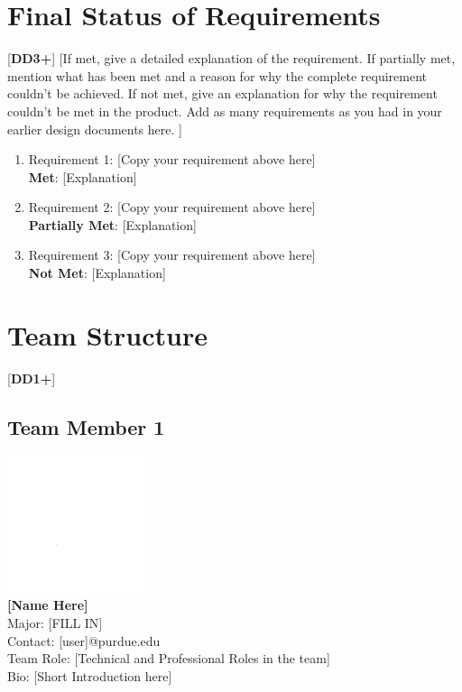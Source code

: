 \documentclass[letterpaper, 11pt]{article}
\begin{document}
\clearpage
\section{Final Status of Requirements}
 [\textbf{DD3+}]
 [If met, give a detailed explanation of the requirement. If partially met, mention what has been met and a reason for why the complete requirement couldn’t be achieved. If not met, give an explanation for why the requirement couldn’t be met in the product. Add as many requirements as you had in your earlier design documents here. ]
\begin{enumerate}
    \item Requirement 1: [Copy your requirement above here] \\
          \textbf{Met}: [Explanation]
    \item Requirement 2: [Copy your requirement above here] \\
          \textbf{Partially Met}: [Explanation]
    \item Requirement 3: [Copy your requirement above here] \\
          \textbf{Not Met}: [Explanation]
\end{enumerate}

\clearpage
\section{Team Structure}
 [\textbf{DD1+}]
\subsection{Team Member 1}
\includegraphics[height=4cm]{white.png} \\
\textbf{[Name Here]}\\
Major: [FILL IN]\\
Contact: [user]@purdue.edu\\
Team Role: [Technical and Professional Roles in the team] \\
Bio: [Short Introduction here]
\end{document}
